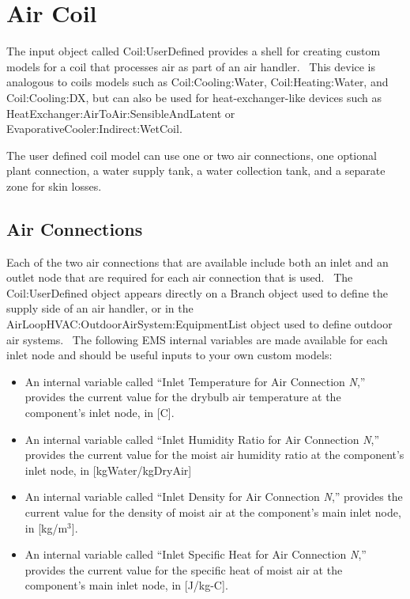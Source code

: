 \section{Air Coil}\label{air-coil}

The input object called Coil:UserDefined provides a shell for creating custom models for a coil that processes air as part of an air handler.~ This device is analogous to coils models such as Coil:Cooling:Water, Coil:Heating:Water, and Coil:Cooling:DX, but can also be used for heat-exchanger-like devices such as HeatExchanger:AirToAir:SensibleAndLatent or EvaporativeCooler:Indirect:WetCoil.

The user defined coil model can use one or two air connections, one optional plant connection, a water supply tank, a water collection tank, and a separate zone for skin losses.

\subsection{Air Connections}\label{air-connections}

Each of the two air connections that are available include both an inlet and an outlet node that are required for each air connection that is used.~ The Coil:UserDefined object appears directly on a Branch object used to define the supply side of an air handler, or in the AirLoopHVAC:OutdoorAirSystem:EquipmentList object used to define outdoor air systems.~ The following EMS internal variables are made available for each inlet node and should be useful inputs to your own custom models:

\begin{itemize}
\item
  An internal variable called ``Inlet Temperature for Air Connection \emph{N},'' provides the current value for the drybulb air temperature at the component's inlet node, in {[}C{]}.
\item
  An internal variable called ``Inlet Humidity Ratio for Air Connection \emph{N},'' provides the current value for the moist air humidity ratio at the component's inlet node, in {[}kgWater/kgDryAir{]}
\item
  An internal variable called ``Inlet Density for Air Connection \emph{N},'' provides the current value for the density of moist air at the component's main inlet node, in {[}kg/m\(^{3}\){]}.
\item
  An internal variable called ``Inlet Specific Heat for Air Connection \emph{N},'' provides the current value for the specific heat of moist air at the component's main inlet node, in {[}J/kg-C{]}.
\end{itemize}

